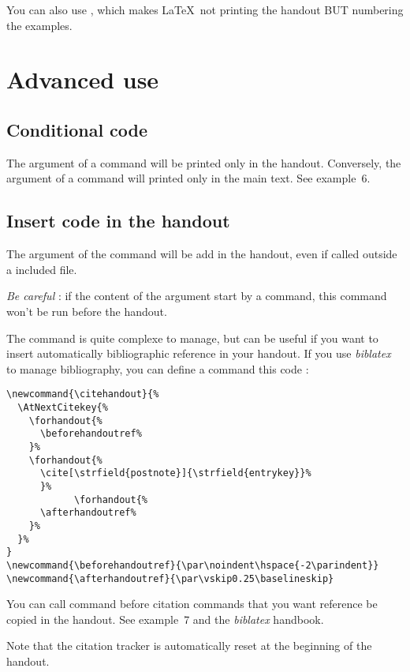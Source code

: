 \documentclass{ltxdockit}[2011/03/25]
\begin{document}
\label{printing} You can also use , which makes \LaTeX\ not printing the handout BUT numbering the examples.

\section{Advanced use}
\subsection{Conditional code}

The argument of a   command will be printed only in the handout. Conversely, the argument of a command  will printed only in the main text. See example~6.

\subsection{Insert code in the handout}

The argument of the   command will be add in the handout, even if called outside a included file. 

\emph{Be careful} : if the content of the argument start by a command, this command won't be run before the handout. 

The  command is quite complexe to manage, but can be useful if you want to insert automatically bibliographic reference in your handout. If you use \emph{biblatex} to manage bibliography, you can define a  command  this code  :

\begin{verbatim}
\newcommand{\citehandout}{%
  \AtNextCitekey{%
    \forhandout{%
      \beforehandoutref%
    }%
    \forhandout{%
      \cite[\strfield{postnote}]{\strfield{entrykey}}%
      }%
            \forhandout{%
      \afterhandoutref%
    }%
  }%
}
\newcommand{\beforehandoutref}{\par\noindent\hspace{-2\parindent}}
\newcommand{\afterhandoutref}{\par\vskip0.25\baselineskip}
\end{verbatim}

You can call  command before citation commands that you want reference be copied in the handout. See example~7 and the \emph{biblatex} handbook.

Note that the citation tracker is automatically reset at the beginning of the handout.
\end{document}
